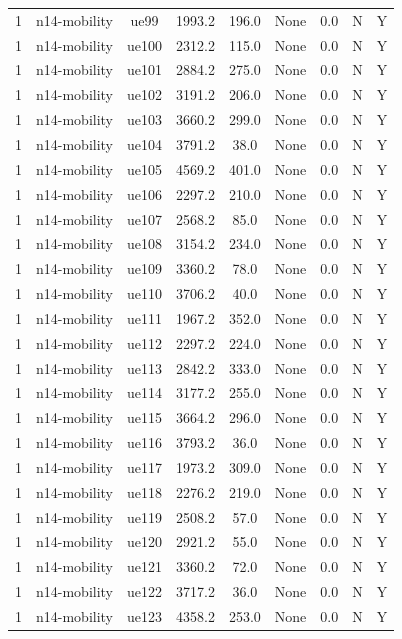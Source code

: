 \begin{table}[ht]
\begin{tabular}{|c|c|c|c|c|c|c|c|c|}
1 & n14-mobility & ue99 & 1993.2 & 196.0 & None & 0.0 & N & Y \\
1 & n14-mobility & ue100 & 2312.2 & 115.0 & None & 0.0 & N & Y \\
1 & n14-mobility & ue101 & 2884.2 & 275.0 & None & 0.0 & N & Y \\
1 & n14-mobility & ue102 & 3191.2 & 206.0 & None & 0.0 & N & Y \\
1 & n14-mobility & ue103 & 3660.2 & 299.0 & None & 0.0 & N & Y \\
1 & n14-mobility & ue104 & 3791.2 & 38.0 & None & 0.0 & N & Y \\
1 & n14-mobility & ue105 & 4569.2 & 401.0 & None & 0.0 & N & Y \\
1 & n14-mobility & ue106 & 2297.2 & 210.0 & None & 0.0 & N & Y \\
1 & n14-mobility & ue107 & 2568.2 & 85.0 & None & 0.0 & N & Y \\
1 & n14-mobility & ue108 & 3154.2 & 234.0 & None & 0.0 & N & Y \\
1 & n14-mobility & ue109 & 3360.2 & 78.0 & None & 0.0 & N & Y \\
1 & n14-mobility & ue110 & 3706.2 & 40.0 & None & 0.0 & N & Y \\
1 & n14-mobility & ue111 & 1967.2 & 352.0 & None & 0.0 & N & Y \\
1 & n14-mobility & ue112 & 2297.2 & 224.0 & None & 0.0 & N & Y \\
1 & n14-mobility & ue113 & 2842.2 & 333.0 & None & 0.0 & N & Y \\
1 & n14-mobility & ue114 & 3177.2 & 255.0 & None & 0.0 & N & Y \\
1 & n14-mobility & ue115 & 3664.2 & 296.0 & None & 0.0 & N & Y \\
1 & n14-mobility & ue116 & 3793.2 & 36.0 & None & 0.0 & N & Y \\
1 & n14-mobility & ue117 & 1973.2 & 309.0 & None & 0.0 & N & Y \\
1 & n14-mobility & ue118 & 2276.2 & 219.0 & None & 0.0 & N & Y \\
1 & n14-mobility & ue119 & 2508.2 & 57.0 & None & 0.0 & N & Y \\
1 & n14-mobility & ue120 & 2921.2 & 55.0 & None & 0.0 & N & Y \\
1 & n14-mobility & ue121 & 3360.2 & 72.0 & None & 0.0 & N & Y \\
1 & n14-mobility & ue122 & 3717.2 & 36.0 & None & 0.0 & N & Y \\
1 & n14-mobility & ue123 & 4358.2 & 253.0 & None & 0.0 & N & Y \\

\end{tabular}
\end{table}
